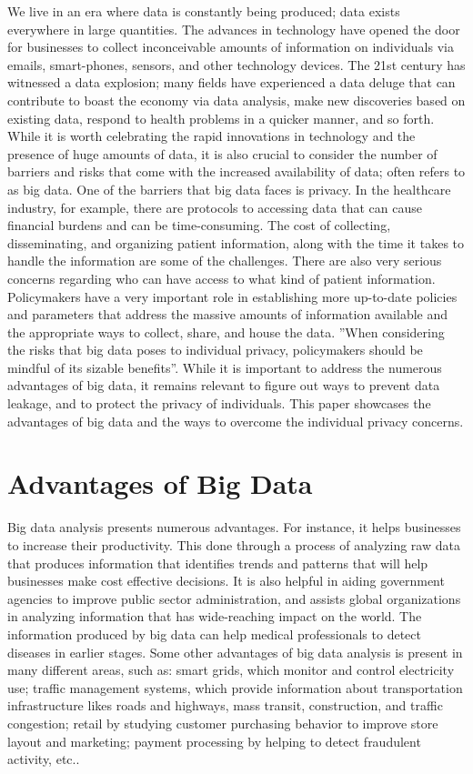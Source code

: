 \documentclass[sigconf]{acmart}
\begin{document}
We live in an era where data is constantly being produced; data exists everywhere in large quantities. The advances in technology have opened the door for businesses to collect inconceivable amounts of information on individuals via emails, smart-phones, sensors, and other technology devices. The 21st century has witnessed a data explosion; many fields have experienced a data deluge that can contribute to boast the economy via data analysis, make new discoveries based on existing data, respond to health problems in a quicker manner, and so forth. While it is worth celebrating the rapid innovations in technology and the presence of huge amounts of data, it is also crucial to consider the number of barriers and risks that come with the increased availability of data; often refers to as big data. 
One of the barriers that big data faces is privacy. In the healthcare industry, for example, there are protocols to accessing data that can cause financial burdens and can be time-consuming.  The cost of collecting, disseminating, and organizing patient information, along with the time it takes to handle the information are some of the challenges. There are also very serious concerns regarding who can have access to what kind of patient information. Policymakers have a very important role in establishing more up-to-date policies and parameters that address the massive amounts of information available and the appropriate ways to collect, share, and house the data. ''When considering the risks that big data poses to individual privacy, policymakers should be mindful of its sizable benefits''\cite{tene2012big}. While it is important to address the numerous advantages of big data, it remains relevant to figure out ways to prevent data leakage, and to protect the privacy of individuals. This paper showcases the advantages of big data and the ways to overcome the individual privacy concerns. 
\cite{roski2014creating}    

\section{Advantages of Big Data}

Big data analysis presents numerous advantages. For instance, it helps businesses to increase their productivity. This done through a process of analyzing raw data that produces information that identifies trends and patterns that will help businesses make cost effective decisions. It is also helpful in aiding government agencies to improve public sector administration, and assists global organizations in analyzing information that has wide-reaching impact on the world. The information produced by big data can help medical professionals to detect diseases in earlier stages. Some other advantages of big data analysis is present in many different areas, such as:  smart grids, which monitor and control electricity use; traffic management systems, which provide information about transportation infrastructure likes roads and highways, mass transit, construction, and traffic congestion; retail by studying customer purchasing behavior to improve store layout and marketing; payment processing by helping to detect fraudulent activity, etc.\cite{tene2012big}.
\end{document}
